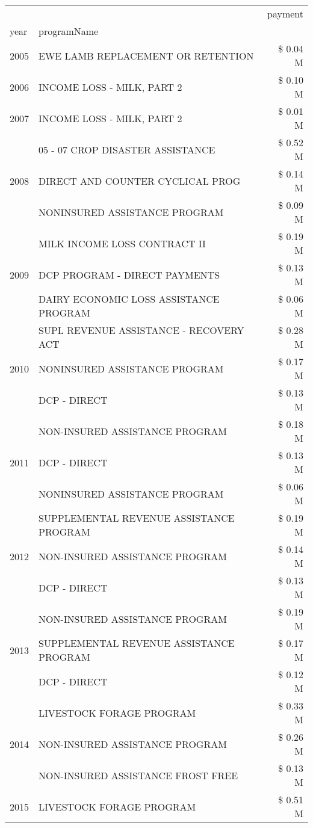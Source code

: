 \begin{tabular}{llr}
\toprule
 &  & payment \\
year & programName &  \\
\midrule
2005 & EWE LAMB REPLACEMENT OR RETENTION & \$ 0.04 M \\
\cline{1-3}
2006 & INCOME LOSS - MILK, PART 2 & \$ 0.10 M \\
\cline{1-3}
2007 & INCOME LOSS - MILK, PART 2 & \$ 0.01 M \\
\cline{1-3}
\multirow[t]{3}{*}{2008} & 05 - 07 CROP DISASTER ASSISTANCE & \$ 0.52 M \\
 & DIRECT AND COUNTER CYCLICAL PROG & \$ 0.14 M \\
 & NONINSURED ASSISTANCE PROGRAM & \$ 0.09 M \\
\cline{1-3}
\multirow[t]{3}{*}{2009} & MILK INCOME LOSS CONTRACT II & \$ 0.19 M \\
 & DCP PROGRAM - DIRECT PAYMENTS & \$ 0.13 M \\
 & DAIRY ECONOMIC LOSS ASSISTANCE PROGRAM & \$ 0.06 M \\
\cline{1-3}
\multirow[t]{3}{*}{2010} & SUPL REVENUE ASSISTANCE - RECOVERY ACT & \$ 0.28 M \\
 & NONINSURED ASSISTANCE PROGRAM & \$ 0.17 M \\
 & DCP - DIRECT & \$ 0.13 M \\
\cline{1-3}
\multirow[t]{3}{*}{2011} & NON-INSURED ASSISTANCE PROGRAM & \$ 0.18 M \\
 & DCP - DIRECT & \$ 0.13 M \\
 & NONINSURED ASSISTANCE PROGRAM & \$ 0.06 M \\
\cline{1-3}
\multirow[t]{3}{*}{2012} & SUPPLEMENTAL REVENUE ASSISTANCE PROGRAM & \$ 0.19 M \\
 & NON-INSURED ASSISTANCE PROGRAM & \$ 0.14 M \\
 & DCP - DIRECT & \$ 0.13 M \\
\cline{1-3}
\multirow[t]{3}{*}{2013} & NON-INSURED ASSISTANCE PROGRAM & \$ 0.19 M \\
 & SUPPLEMENTAL REVENUE ASSISTANCE PROGRAM & \$ 0.17 M \\
 & DCP - DIRECT & \$ 0.12 M \\
\cline{1-3}
\multirow[t]{3}{*}{2014} & LIVESTOCK FORAGE PROGRAM & \$ 0.33 M \\
 & NON-INSURED ASSISTANCE PROGRAM & \$ 0.26 M \\
 & NON-INSURED ASSISTANCE FROST FREE & \$ 0.13 M \\
\cline{1-3}
\multirow[t]{3}{*}{2015} & LIVESTOCK FORAGE PROGRAM & \$ 0.51 M \\

\end{tabular}

